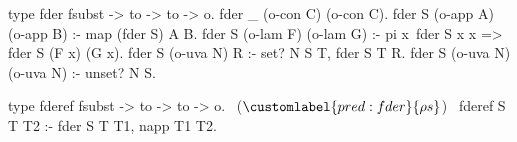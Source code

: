   type fder fsubst -> to -> to -> o.
  fder _ (o-con C) (o-con C).
  fder S (o-app A) (o-app B) :- map (fder S) A B.
  fder S (o-lam F) (o-lam G) :-
    pi x\ fder S x x => fder S (F x) (G x).
  fder S (o-uva N) R :- set? N S T, fder S T R.
  fder S (o-uva N) (o-uva N) :- unset? N S.

  type fderef fsubst -> to -> to -> o.                 ~($\customlabel{pred:fder}{\rho s}$)~
  fderef S T T2 :- fder S T T1, napp T1 T2.
